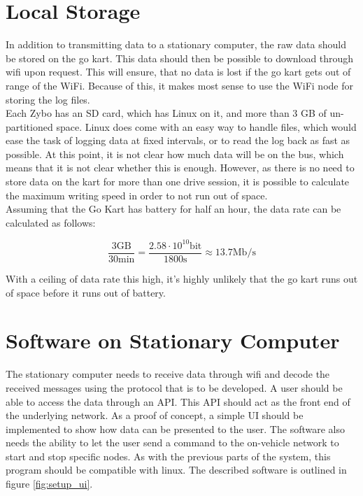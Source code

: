 
\section{Local Storage}
In addition to transmitting data to a stationary computer, the raw data should be stored on the go kart.
This data should then be possible to download through wifi upon request.
This will ensure, that no data is lost if the go kart gets out of range of the WiFi.
Because of this, it makes most sense to use the WiFi node for storing the log files.\\

Each Zybo has an SD card, which has Linux on it, and more than 3 GB of un-partitioned space. 
Linux does come with an easy way to handle files, which would ease the task of logging data at fixed intervals, or to read the log back as fast as possible.
At this point, it is not clear how much data will be on the bus, which means that it is not clear whether this is enough.
However, as there is no need to store data on the kart for more than one drive session, it is possible to calculate the maximum writing speed in order to not run out of space.\\

Assuming that the Go Kart has battery for half an hour, the data rate can be calculated as follows:

\begin{equation}
	\frac{3\mathrm{GB}}{30\si{\minute}} = \frac{2.58 \cdot 10^{10} \mathrm{bit}}{1800 \si{\second}} \approx 13.7 \mathrm{Mb/s}
\end{equation}

With a ceiling of data rate this high, it's highly unlikely that the go kart runs out of space before it runs out of battery.

\section{Software on Stationary Computer}
The stationary computer needs to receive data through wifi and decode the received messages using the protocol that is to be developed.
A user should be able to access the data through an API.
This API should act as the front end of the underlying network.
As a proof of concept, a simple UI should be implemented to show how data can be presented to the user.
The software also needs the ability to let the user send a command to the on-vehicle network to start and stop specific nodes.
As with the previous parts of the system, this program should be compatible with linux.
The described software is outlined in figure \ref{fig:setup_ui}.

